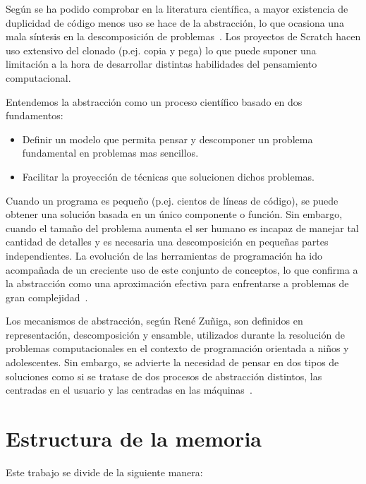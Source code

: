 \documentclass[a4paper, 12pt]{book}
\begin{document}
Según se ha podido comprobar en la literatura científica, a mayor existencia de duplicidad de código menos uso se hace de la abstracción, lo que ocasiona una mala síntesis en la descomposición de problemas~\cite{baxter_yahin}. Los proyectos de Scratch hacen uso extensivo del clonado (p.ej. copia y pega) lo que puede suponer una limitación a la hora de desarrollar distintas habilidades del pensamiento computacional.

Entendemos la abstracción como un proceso científico basado en dos fundamentos:
\begin{itemize}
\item Definir un modelo que permita pensar y descomponer un problema fundamental en problemas mas sencillos.
\item Facilitar la proyección de técnicas que solucionen dichos problemas.
\end{itemize}

Cuando un programa es peque\~{n}o (p.ej. cientos de líneas de código), se puede obtener una solución basada en un único componente o función. Sin embargo, cuando el tama\~{n}o del problema aumenta el ser humano es incapaz de manejar tal cantidad de detalles y es necesaria una descomposición en peque\~{n}as partes independientes. La evolución de las herramientas de programación ha ido acompañada de un creciente uso de este conjunto de conceptos, lo que confirma a la abstracción como una aproximación efectiva para enfrentarse a problemas de gran complejidad~\cite{garridoabstraccion}.

Los mecanismos de abstracción, según René Zuñiga, son definidos en representación, descomposición y ensamble, utilizados durante la resolución de problemas computacionales en el contexto de programación orientada a niños y adolescentes. Sin embargo, se advierte la necesidad de pensar en dos tipos de soluciones como si se tratase de dos procesos de abstracción distintos, las centradas en el usuario y las centradas en las máquinas~\cite{munoz2014abstraccion}.


\section{Estructura de la memoria}
\label{sec:estructura}

Este trabajo se divide de la siguiente manera:
\end{document}

